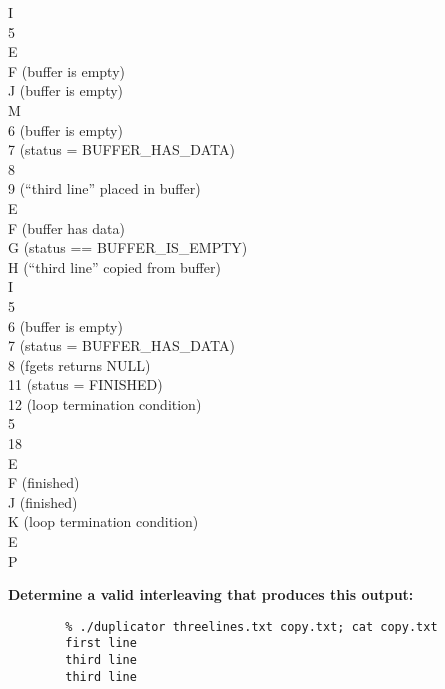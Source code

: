 {\begin{multicols}{2}
        \phantom{foobarbaz} I \\
        5 \\
        \phantom{foobarbaz} E \\
        \phantom{foobarbaz} F   (buffer is empty) \\
        \phantom{foobarbaz} J   (buffer is empty) \\
        \phantom{foobarbaz} M \\
        6   (buffer is empty) \\
        7   (status = BUFFER\_HAS\_DATA) \\
        8 \\
        9   (``third line'' placed in buffer) \\
        \phantom{foobarbaz} E \\
        \phantom{foobarbaz} F   (buffer has data) \\
        \phantom{foobarbaz} G   (status == BUFFER\_IS\_EMPTY) \\
        \phantom{foobarbaz} H   (``third line'' copied from buffer) \\
        \phantom{foobarbaz} I \\
        5 \\
        6   (buffer is empty) \\
        7   (status = BUFFER\_HAS\_DATA) \\
        8   (fgets returns NULL) \\
        11  (status = FINISHED) \\
        12  (loop termination condition) \\
        5 \\
        18 \\
        \phantom{foobarbaz} E \\
        \phantom{foobarbaz} F   (finished) \\
        \phantom{foobarbaz} J   (finished) \\
        \phantom{foobarbaz} K   (loop termination condition) \\
        \phantom{foobarbaz} E \\
        \phantom{foobarbaz} P
    \end{multicols}}

    \textbf{Determine a valid interleaving that produces this output:}
    \begin{verbatim}
        % ./duplicator threelines.txt copy.txt; cat copy.txt
        first line
        third line
        third line
    \end{verbatim}

